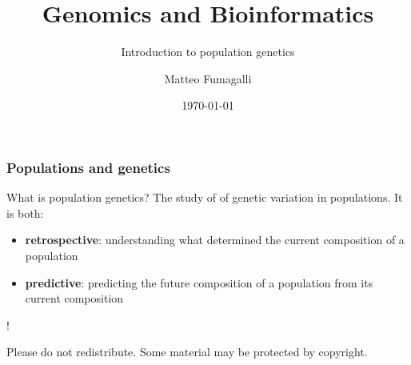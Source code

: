 \documentclass[presentation]{beamer}
\institute{\texttt{[image: Imperial\_1\_Pantone\_solid.eps]}}
\title{Genomics and Bioinformatics}
\subtitle{Introduction to population genetics}
\author{Matteo Fumagalli}
\date{\today}
\begin{document}
 
\frame{\titlepage}

\begin{frame}
        \frametitle{Populations and genetics}

        \begin{block}{What is population genetics?}
                The study of of genetic variation in populations. It is both:
                \begin{itemize}
                        \item \textbf{retrospective}: understanding what determined the current composition of a population
                        \item \textbf{predictive}: predicting the future composition of a population from its current composition
                \end{itemize}
        \end{block}

\end{frame}













\begin{frame}{!}

	Please do not redistribute. Some material may be protected by copyright.

\end{frame}

 
\end{document}
